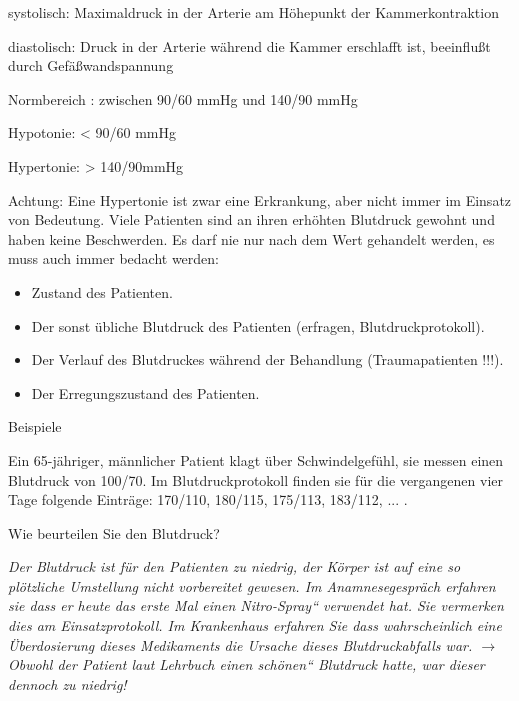\documentclass{article}
\begin{document}
{\mdseries
systolisch:  Maximaldruck in der Arterie am H\"ohepunkt der
Kammerkontraktion}

{\mdseries
diastolisch: Druck in der Arterie w\"ahrend die Kammer erschlafft ist,
beeinflu{\ss}t durch  Gef\"a{\ss}wandspannung}

{\mdseries
Normbereich : zwischen 90/60 mmHg und 140/90 mmHg  }

{\mdseries
Hypotonie:  {\textless} 90/60 mmHg}

{\mdseries
Hypertonie: {\textgreater} 140/90mmHg  }

{\mdseries
Achtung: Eine Hypertonie ist zwar eine Erkrankung, aber nicht immer im
Einsatz von Bedeutung. Viele Patienten sind an ihren erh\"ohten
Blutdruck gewohnt und haben keine Beschwerden. Es darf nie nur nach dem
Wert gehandelt werden, es muss auch immer bedacht werden: }

\begin{itemize}
\item {\mdseries
Zustand des Patienten.}

\item {\mdseries
Der sonst \"ubliche Blutdruck des Patienten (erfragen,
Blutdruckprotokoll).}

\item {\mdseries
Der Verlauf des Blutdruckes w\"ahrend der Behandlung (Traumapatienten
!!!).}

\item {\mdseries
Der Erregungszustand des Patienten.}

\end{itemize}
{\mdseries\color{black}
Beispiele}

Ein 65-j\"ahriger, m\"annlicher Patient klagt \"uber Schwindelgef\"uhl,
sie messen einen Blutdruck von 100/70. Im Blutdruckprotokoll finden sie
f\"ur die vergangenen vier Tage folgende Eintr\"age: 170/110, 180/115,
175/113, 183/112, ... .

Wie beurteilen Sie den Blutdruck? 

{\itshape
Der Blutdruck ist f\"ur den Patienten zu niedrig, der K\"orper ist auf
eine so pl\"otzliche Umstellung nicht vorbereitet gewesen. Im
Anamnesegespr\"ach erfahren sie dass er heute das erste Mal einen
{\quotedblbase}Nitro-Spray{\textquotedblleft} verwendet hat. Sie
vermerken dies am Einsatzprotokoll. Im Krankenhaus erfahren Sie dass
wahrscheinlich eine \"Uberdosierung dieses Medikaments die Ursache
dieses Blutdruckabfalls war. ${\rightarrow}$ Obwohl der Patient laut
Lehrbuch einen {\quotedblbase}sch\"onen{\textquotedblleft} Blutdruck
hatte, war dieser dennoch zu niedrig!}
\end{document}
